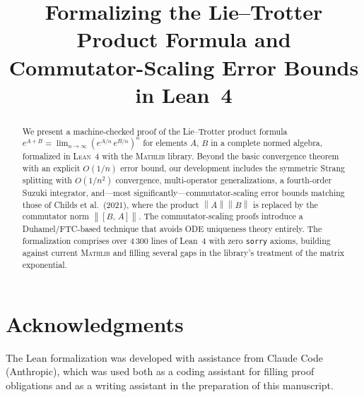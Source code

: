 \documentclass[11pt]{article}
\title{Formalizing the Lie--Trotter Product Formula
and Commutator-Scaling Error Bounds in Lean~4}
\newcommand{\Lean}{\textsc{Lean}~4\xspace}
\newcommand{\Mathlib}{\textsc{Mathlib}\xspace}
\newcommand{\norm}[1]{\left\|#1\right\|}
\newcommand{\comm}[2]{[#1,\,#2]}
\theoremstyle{definition}
\theoremstyle{remark}
\begin{document}
\maketitle

\begin{abstract}
We present a machine-checked proof of the Lie--Trotter product formula
$e^{A+B} = \lim_{n\to\infty} (e^{A/n}\,e^{B/n})^n$
for elements $A$, $B$ in a complete normed algebra, formalized in \Lean with the
\Mathlib library.
Beyond the basic convergence theorem with an explicit $O(1/n)$ error bound,
our development includes the symmetric Strang splitting with $O(1/n^2)$ convergence,
multi-operator generalizations, a fourth-order Suzuki integrator,
and---most significantly---commutator-scaling error bounds matching those of
Childs et al.\ (2021), where the product $\norm{A}\norm{B}$ is replaced by
the commutator norm $\norm{\comm{B}{A}}$.
The commutator-scaling proofs introduce a Duhamel/FTC-based technique that
avoids ODE uniqueness theory entirely.
The formalization comprises over 4\,300 lines of Lean~4 with zero
\texttt{sorry} axioms, building against current \Mathlib and filling several
gaps in the library's treatment of the matrix exponential.
\end{abstract}








\appendix


\section*{Acknowledgments}
The Lean formalization was developed with assistance from
Claude Code (Anthropic), which was used both as a coding assistant for
filling proof obligations and as a writing assistant in the preparation
of this manuscript.



\end{document}
